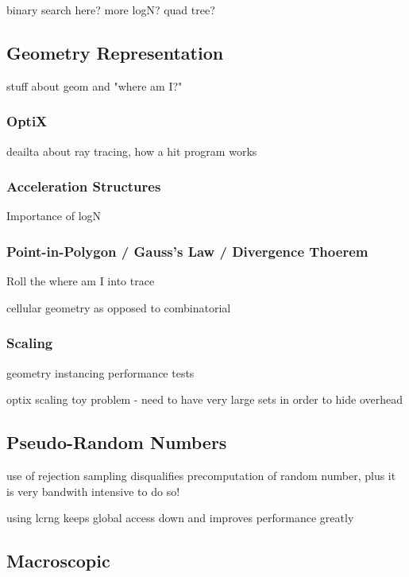 binary search here? more logN?  quad tree?

\subsection{Geometry Representation}

stuff about geom and "where am I?"

\subsubsection{OptiX}

deailta about ray tracing, how a hit program works

\subsubsection{Acceleration Structures}

Importance of logN


\subsubsection{Point-in-Polygon / Gauss's Law / Divergence Thoerem}

Roll the where am I into  trace

cellular geometry as opposed to combinatorial


\subsubsection{Scaling}

geometry instancing performance tests

optix scaling toy problem - need to have very large sets in order to hide overhead


\subsection{Pseudo-Random Numbers}

use of rejection sampling disqualifies precomputation of random number, plus it is very bandwith intensive to do so!

using lcrng keeps global access down and improves performance greatly

\subsection{Macroscopic}

